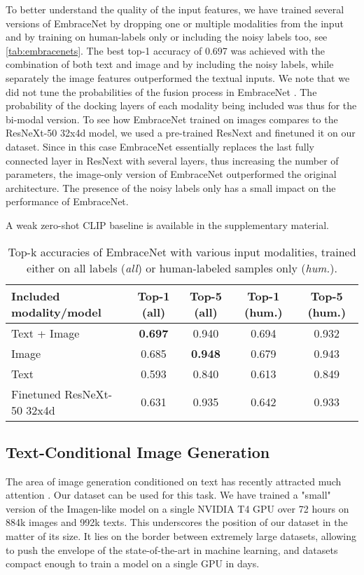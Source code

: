 \documentclass{bmvc2k}
\begin{document}
To better understand the quality of the input features, we have trained several versions of EmbraceNet by dropping one or multiple modalities from the input and by training on human-labels only or including the noisy labels too, see \autoref{tab:embracenets}. The best top-1 accuracy of 0.697 was achieved with the combination of both text and image and by including the noisy labels, while separately the image features outperformed the textual inputs. We note that we did not tune the probabilities of the fusion process in EmbraceNet \cite{embracenet}. The probability of the docking layers of each modality being included was thus  for the bi-modal version. To see how EmbraceNet trained on images compares to the ResNeXt-50 32x4d model, we used a pre-trained ResNext and finetuned it on our dataset. Since in this case EmbraceNet essentially replaces the last fully connected layer in ResNext with several layers, thus increasing the number of parameters, the image-only version of EmbraceNet outperformed the original architecture. The presence of the noisy labels only has a small impact on the performance of EmbraceNet.

 A weak zero-shot CLIP baseline is available in the supplementary material.

\begin{table}
\centering
\caption{Top-k accuracies of EmbraceNet with various input modalities, trained either on all labels (\textit{all}) or human-labeled samples only (\textit{hum.}).}
\vspace{1mm}
\renewcommand{\arraystretch}{1.1}
\label{tab:embracenets}
\begin{tabular}{lcccc}
\hline
Included modality/model & Top-1 (all) &   Top-5 (all)  & Top-1 (hum.) &   Top-5 (hum.) \\
\hline
Text + Image & \textbf{0.697} & 0.940 & 0.694 & 0.932  \\
Image & 0.685 & \textbf{ 0.948} & 0.679 & 0.943  \\
Text &  0.593 & 0.840 &  0.613 & 0.849  \\
Finetuned ResNeXt-50 32x4d & 0.631 &  0.935 & 0.642 & 0.933 \\
\hline
\end{tabular}
\end{table}

\subsection{Text-Conditional Image Generation}
\label{sec:experiments_imagen}
The area of image generation conditioned on text has recently attracted much attention \cite{imagen,dall-e-2,rombach2022high}. Our dataset can be used for this task. We have trained a "small" version of the Imagen-like model \cite{imagen} on a single NVIDIA T4 GPU over 72 hours on 884k images and 992k texts. This underscores the position of our dataset in the matter of its size. It lies on the border between extremely large datasets, allowing to push the envelope of the state-of-the-art in machine learning,  and datasets compact enough to train a model on a single GPU in days. 
\end{document}
